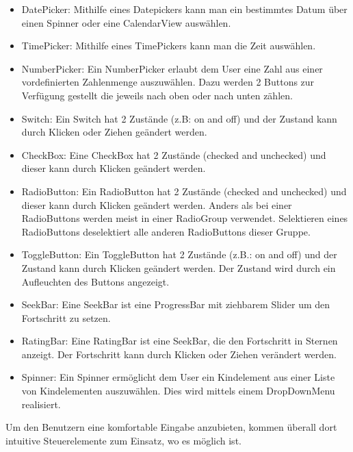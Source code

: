 \documentclass[FIPLY_base.tex]{subfiles}
\begin{document}
\begin{itemize}
	\item DatePicker: Mithilfe eines Datepickers kann man ein bestimmtes Datum über einen Spinner oder eine CalendarView auswählen.
	\item TimePicker: Mithilfe eines TimePickers kann man die Zeit auswählen.
	\item NumberPicker: Ein NumberPicker erlaubt dem User eine Zahl aus einer vordefinierten Zahlenmenge auszuwählen. Dazu werden 2 Buttons zur Verfügung gestellt die jeweils nach oben oder nach unten zählen.
	\item Switch: Ein Switch hat 2 Zustände (z.B: on and off) und der Zustand kann durch Klicken oder Ziehen geändert werden.
	\item CheckBox: Eine CheckBox hat 2 Zustände (checked and unchecked) und dieser kann durch Klicken geändert werden.
	\item RadioButton: Ein RadioButton hat 2 Zustände (checked and unchecked) und 
	dieser kann durch Klicken geändert werden. Anders als bei einer 
	RadioButtons werden meist in einer RadioGroup verwendet.
	Selektieren eines RadioButtons deselektiert alle anderen RadioButtons dieser Gruppe.
	\item ToggleButton: Ein ToggleButton hat 2 Zustände (z.B.: on and off) und der Zustand kann durch Klicken geändert werden. Der Zustand wird durch ein Aufleuchten des Buttons angezeigt.
	\item SeekBar: Eine SeekBar ist eine ProgressBar mit ziehbarem Slider um den Fortschritt zu setzen.
	\item RatingBar: Eine RatingBar ist eine SeekBar, die den Fortschritt in Sternen anzeigt. Der Fortschritt kann durch Klicken oder Ziehen verändert 
	werden.
	\item Spinner: Ein Spinner ermöglicht dem User ein Kindelement aus einer Liste von Kindelementen auszuwählen. Dies wird mittels einem 
	DropDownMenu realisiert.	
\end{itemize}
Um den Benutzern eine komfortable Eingabe anzubieten, kommen überall dort intuitive Steuerelemente zum Einsatz, wo es möglich ist.
\end{document}
